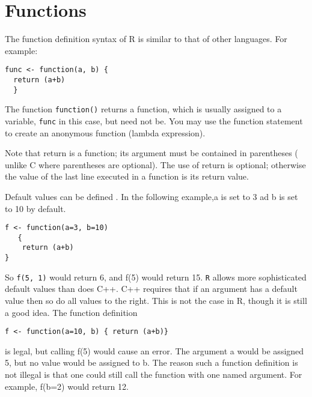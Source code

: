 \documentclass[a4paper,12pt]{article}
\begin{document}

\newpage
\section{Functions}

The function definition syntax of R is similar to that of other languages. For example:
\begin{verbatim}
func <- function(a, b) { 
  return (a+b)
  }
\end{verbatim}
The function \texttt{function()} returns a function, which is usually assigned to a variable, \texttt{func} in this case, but need not be. You may use the function statement to create an anonymous function (lambda expression).

Note that return is a function; its argument must be contained in parentheses ( unlike C where parentheses are optional). The use of return is optional; otherwise the value of the last line executed in a function is its return value.

Default values can be defined . In the following example,a is set to 3 ad  b is set to 10 by default.
\begin{verbatim}
f <- function(a=3, b=10) 
   {
    return (a+b)
}
\end{verbatim}
So \texttt{f(5, 1)} would return 6, and f(5) would return 15. \texttt{R} allows more sophisticated default values than does C++. 
C++ requires that if an argument has a default value then so do all values to the right. This is not the case in R, though it is still a good idea. The function definition

\begin{framed}
\begin{verbatim}
f <- function(a=10, b) { return (a+b)}
\end{verbatim}
\end{framed}

is legal, but calling f(5) would cause an error. The argument a would be assigned 5, but no value would be assigned to b. The reason such a function definition is not illegal is that one could still call the function with one named argument. For example, f(b=2) would return 12.

\end{document}

